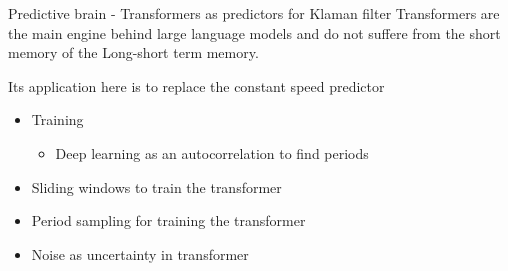 \begin{frame}{Predictive brain - Transformers as predictors for Klaman filter}
    Transformers are the main engine behind large language models and do not suffere from the short memory of the Long-short term memory.
    
    Its application here is to replace the constant speed predictor

    
    \begin{itemize}
        \item Training
        \begin{itemize}
            \item Deep learning as an autocorrelation to find periods
        \end{itemize}
        \item Sliding windows to train the transformer
        \item Period sampling for training the transformer
        \item Noise as uncertainty in transformer
    
    \end{itemize}
\end{frame}